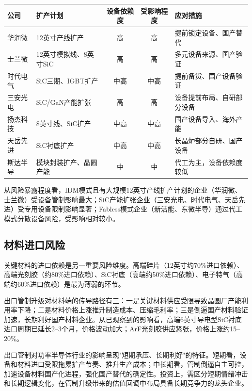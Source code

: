\begin{exhibitbox}[表 8-5：主要功率半导体企业受设备管制影响评估]
\centering
\small
\begin{tabularx}{\textwidth}{l X c c L{3.5cm}}
\toprule
\textbf{公司} & \textbf{扩产计划} & \textbf{设备依赖度} & \textbf{受影响程度} & \textbf{应对措施} \\
\midrule
华润微 & 12英寸产线扩产 & 高 & \textcolor{riskred}{高} & 提前锁定设备、国产替代 \\
士兰微 & 12英寸模拟线、8英寸SiC & 高 & \textcolor{riskred}{高} & 多元设备来源、国产验证 \\
时代电气 & SiC三期、IGBT扩产 & 中高 & \textcolor{riskamber}{中高} & 提前备货、国产设备验证 \\
三安光电 & SiC/GaN产能扩张 & 高 & \textcolor{riskred}{高} & 设备提前布局、自研部分设备 \\
扬杰科技 & 8英寸线、SiC扩产 & 中高 & \textcolor{riskamber}{中高} & 国产设备导入、海外产能 \\
天岳先进 & SiC衬底扩产 & 中高 & \textcolor{riskamber}{中高} & 长晶炉部分自研、国产设备 \\
斯达半导 & 模块封装扩产、晶圆产能 & 中 & \textcolor{riskamber}{中} & 代工为主，设备依赖度较低 \\
\bottomrule
\end{tabularx}
\end{exhibitbox}

从风险暴露程度看，IDM模式且有大规模12英寸产线扩产计划的企业（华润微、士兰微）受设备管制影响最大；SiC产能扩张企业（三安光电、时代电气、天岳先进）受专用设备限制影响显著；Fabless模式企业（新洁能、东微半导）通过代工模式分散设备风险，受影响相对较小。

\subsection{材料进口风险}

关键材料的进口依赖是另一重要风险维度。高端硅片（12英寸约70\%进口依赖）、高端光刻胶（约80\%进口依赖）、SiC衬底（高端约50\%进口依赖）、电子特气（高端约60\%进口依赖）是最为薄弱的环节。

出口管制升级对材料端的传导路径有三：一是关键材料供应受限导致晶圆厂产能利用率下降；二是材料价格上涨推升制造成本、压缩毛利率；三是倒逼国产材料验证加速，长期利好国产材料企业。从已观察到的影响看，高端6英寸导电型SiC衬底进口周期已延长2--3个月，价格波动加大；ArF光刻胶供应紧张，价格上涨约15--20\%。

\begin{keyinsight}[出口管制影响评估]
出口管制对功率半导体行业的影响呈现"短期承压、长期利好"的特征。短期看，设备和材料进口受限拖累扩产节奏、推升生产成本；中长期看，管制倒逼自主可控，加速设备材料国产化进程，强化国产替代的确定性。投资上，需区分短期情绪冲击和长期逻辑变化，在管制升级带来的估值回调中布局具备长期竞争力的龙头企业。
\end{keyinsight}

